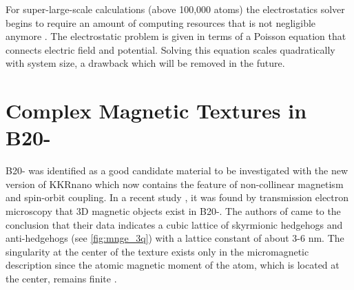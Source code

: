 \documentclass[graybox]{svmult}
\begin{document}
For super-large-scale calculations (above 100,000 atoms) the electrostatics solver begins
to require an amount of computing resources that is not negligible anymore \cite{brommel_juqueen_2017}. 
The electrostatic problem is given in terms of a Poisson equation that connects electric field and potential. 
Solving this equation scales quadratically with system size, a drawback which will be removed in the future.

\section{Complex Magnetic Textures in B20-}
\label{sec:mnge}

B20- was identified as a good candidate material to be investigated with the new
version of KKRnano which now contains the feature of non-collinear magnetism and spin-orbit coupling.
In a recent study \cite{tanigaki_real-space_2015}, it was 
found by transmission electron microscopy that 3D magnetic
objects exist in B20-. The authors of \cite{tanigaki_real-space_2015}
came to the conclusion that their data indicates a
cubic lattice of skyrmionic hedgehogs
and anti-hedgehogs (see \cref{fig:mnge_3q}) 
with a lattice constant of about 3-6 nm.
The singularity at the center of the texture exists only in the micromagnetic description since the
atomic magnetic moment of the atom, which is located at the center,
remains finite \cite{feldtkeller_continuous_2017}.
\end{document}
